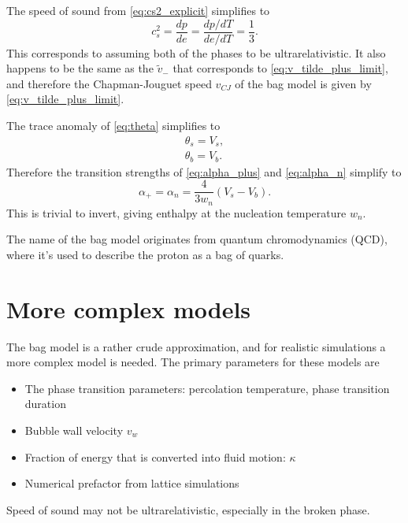 The speed of sound from \eqref{eq:cs2_explicit} simplifies to
\begin{equation}
c_s^2 = \frac{dp}{de} = \frac{dp/dT}{de/dT} = \frac{1}{3}.
\end{equation}
This corresponds to assuming both of the phases to be ultrarelativistic.
It also happens to be the same as the $\tilde{v}_-$ that corresponds to \eqref{eq:v_tilde_plus_limit}, and therefore the Chapman-Jouguet speed $v_{CJ}$ of the bag model is given by \eqref{eq:v_tilde_plus_limit}.

The trace anomaly of \eqref{eq:theta} simplifies to
\begin{align}
\theta_s = V_s, \\
\theta_b = V_b.
\end{align}
Therefore the transition strengths of \eqref{eq:alpha_plus} and \eqref{eq:alpha_n} simplify to
\begin{equation}
\alpha_+ = \alpha_n = \frac{4}{3 w_n} (V_s - V_b).
\label{eq:alpha_n_bag}
\end{equation}
This is trivial to invert, giving enthalpy at the nucleation temperature $w_n$.

The name of the bag model originates from quantum chromodynamics (QCD), where it's used to describe the proton as a bag of quarks.


\section{More complex models}
The bag model is a rather crude approximation, and for realistic simulations a more complex model is needed.
The primary parameters for these models are
\begin{itemize}
    \item The phase transition parameters: percolation temperature, phase transition duration
    \item Bubble wall velocity $v_w$
    \item Fraction of energy that is converted into fluid motion: $\kappa$
    \item Numerical prefactor from lattice simulations
\end{itemize}

Speed of sound may not be ultrarelativistic, especially in the broken phase.

